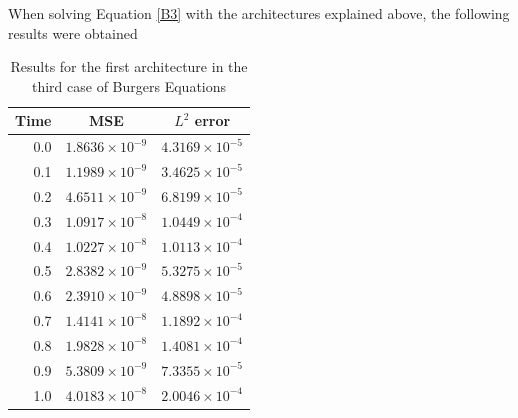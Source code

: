 \documentclass[12pt,letterpaper]{article}
\begin{document}
  When solving Equation \ref{B3} with the architectures explained above, the following results were obtained
  
  \begin{table}[H]
    \begin{center}
    \begin{tabular}{ r | c  c }
    \textbf{Time} & \textbf{MSE} & \textbf{$L^2$ error} \\ \hline
    0.0 & $ 1.8636\times 10^{-9}$ & $ 4.3169\times 10^{-5} $ \\
    0.1 & $ 1.1989\times 10^{-9}$ & $ 3.4625\times 10^{-5} $ \\
    0.2 & $ 4.6511\times 10^{-9}$ & $ 6.8199\times 10^{-5} $ \\
    0.3 & $ 1.0917\times 10^{-8}$ & $ 1.0449\times 10^{-4} $ \\
    0.4 & $ 1.0227\times 10^{-8}$ & $ 1.0113\times 10^{-4} $ \\
    0.5 & $ 2.8382\times 10^{-9}$ & $ 5.3275\times 10^{-5} $ \\
    0.6 & $ 2.3910\times 10^{-9}$ & $ 4.8898\times 10^{-5} $ \\
    0.7 & $ 1.4141\times 10^{-8}$ & $ 1.1892\times 10^{-4} $ \\
    0.8 & $ 1.9828\times 10^{-8}$ & $ 1.4081\times 10^{-4} $ \\
    0.9 & $ 5.3809\times 10^{-9}$ & $ 7.3355\times 10^{-5} $ \\
    1.0 & $ 4.0183\times 10^{-8}$ & $ 2.0046\times 10^{-4} $ \\
    \end{tabular}
    \caption{Results for the first architecture in the third case of Burgers Equations}
    \label{tab:B31}
    \end{center}
    \end{table}
  
\end{document}
